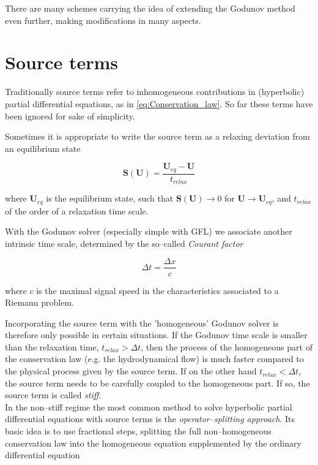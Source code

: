There are many schemes carrying the idea of extending the Godunov method even further, making modifications in many aspects.


\section{Source terms}
\label{sec:Source_terms}

Traditionally source terms refer to inhomogeneous contributions in (hyperbolic) partial differential equations, as in \eqref{eq:Conservation_law}.
So far these terms have been ignored for sake of simplicity.

Sometimes it is appropriate to write the source term as a relaxing deviation from an equilibrium state

\begin{equation}
  \textbf{S}(\textbf{U}) = \frac{\textbf{U}_{eq} - \textbf{U}}{t_{relax}}
\end{equation}

where $\textbf{U}_{eq}$ is the equilibrium state, such that $\textbf{S}(\textbf{U}) \to 0$ for $\textbf{U} \to \textbf{U}_{eq}$, and $t_{relax}$ of the order of a relaxation time scale.
%

With the Godunov solver (especially simple with GFL) we associate another intrinsic time scale, determined by the so--called \textit{Courant factor}

\begin{equation}
  \Delta t = \frac{\Delta x}{c}
\end{equation}

where $c$ is the maximal signal speed in the characteristics associated to a Riemann problem.

Incorporating the source term with the 'homogeneous' Godunov solver is therefore only possible in certain situations.
If the Godunov time scale is smaller than the relaxation time, $t_{relax} > \Delta t$, then the process of the homogeneous part of the conservation law (e.g. the hydrodynamical flow) is much faster compared to the physical process given by the source term.
If on the other hand $t_{relax} < \Delta t$, the source term needs to be carefully coupled to the homogeneous part.
If so, the source term is called \textit{stiff}.
\\[6pt]
%
In the non--stiff regime the most common method to solve hyperbolic partial differential equations with source terms is the \textit{operator--splitting approach}.
Its basic idea is to use fractional steps, splitting the full non--homogeneous conservation law into the homogeneous equation supplemented by the ordinary differential equation


